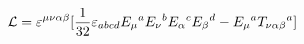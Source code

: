 \begin{equation}
{\cal L} = \varepsilon^{\mu\nu\alpha\beta} [ \frac{1}{32}
\varepsilon_{abcd} E_\mu{}^a E_\nu{}^b E_\alpha{}^c E_\beta{}^d -
E_\mu{}^a T_{\nu\alpha\beta}{}^a ]
\end{equation}

